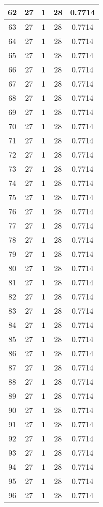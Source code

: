 \documentclass[letterpaper, 12pt]{article}
\begin{document}
\begin{longtable}{|c|c|c|c|c|}
\hline
62 & 27 & 1 & 28 & 0.7714 \\
\hline
63 & 27 & 1 & 28 & 0.7714 \\
\hline
64 & 27 & 1 & 28 & 0.7714 \\
\hline
65 & 27 & 1 & 28 & 0.7714 \\
\hline
66 & 27 & 1 & 28 & 0.7714 \\
\hline
67 & 27 & 1 & 28 & 0.7714 \\
\hline
68 & 27 & 1 & 28 & 0.7714 \\
\hline
69 & 27 & 1 & 28 & 0.7714 \\
\hline
70 & 27 & 1 & 28 & 0.7714 \\
\hline
71 & 27 & 1 & 28 & 0.7714 \\
\hline
72 & 27 & 1 & 28 & 0.7714 \\
\hline
73 & 27 & 1 & 28 & 0.7714 \\
\hline
74 & 27 & 1 & 28 & 0.7714 \\
\hline
75 & 27 & 1 & 28 & 0.7714 \\
\hline
76 & 27 & 1 & 28 & 0.7714 \\
\hline
77 & 27 & 1 & 28 & 0.7714 \\
\hline
78 & 27 & 1 & 28 & 0.7714 \\
\hline
79 & 27 & 1 & 28 & 0.7714 \\
\hline
80 & 27 & 1 & 28 & 0.7714 \\
\hline
81 & 27 & 1 & 28 & 0.7714 \\
\hline
82 & 27 & 1 & 28 & 0.7714 \\
\hline
83 & 27 & 1 & 28 & 0.7714 \\
\hline
84 & 27 & 1 & 28 & 0.7714 \\
\hline
85 & 27 & 1 & 28 & 0.7714 \\
\hline
86 & 27 & 1 & 28 & 0.7714 \\
\hline
87 & 27 & 1 & 28 & 0.7714 \\
\hline
88 & 27 & 1 & 28 & 0.7714 \\
\hline
89 & 27 & 1 & 28 & 0.7714 \\
\hline
90 & 27 & 1 & 28 & 0.7714 \\
\hline
91 & 27 & 1 & 28 & 0.7714 \\
\hline
92 & 27 & 1 & 28 & 0.7714 \\
\hline
93 & 27 & 1 & 28 & 0.7714 \\
\hline
94 & 27 & 1 & 28 & 0.7714 \\
\hline
95 & 27 & 1 & 28 & 0.7714 \\
\hline
96 & 27 & 1 & 28 & 0.7714 \\

\end{longtable}
\end{document}
